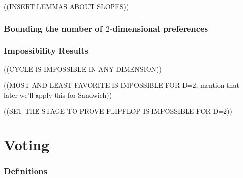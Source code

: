 \documentclass[12pt]{article}
\newcommand{\1}[1]{\mathds{1}[{#1}]}
\begin{document}
    ((INSERT LEMMAS ABOUT SLOPES))

\section{Bounding the number of $2$-dimensional preferences}

\section{Impossibility Results}

  ((CYCLE IS IMPOSSIBLE IN ANY DIMENSION))

  ((MOST AND LEAST FAVORITE IS IMPOSSIBLE FOR D=2,
  mention that later we'll apply this for Sandwich))

  ((SET THE STAGE TO PROVE FLIPFLOP IS IMPOSSIBLE FOR D=2))


\clearpage
\part{Voting}

\section{Definitions}
\end{document}
